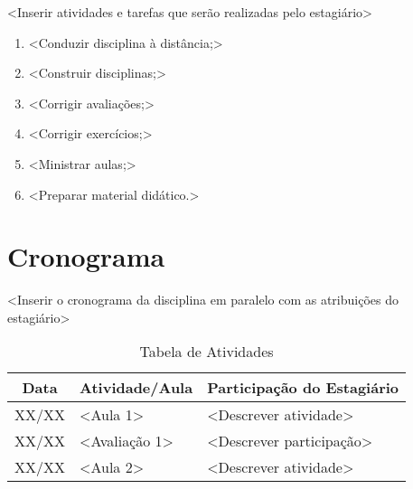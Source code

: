 \documentclass[12pt, a4paper]{article}
\begin{document}

<Inserir atividades e tarefas que serão realizadas pelo estagiário>

\begin{enumerate}
    \item <Conduzir disciplina à distância;>
    \item <Construir disciplinas;>
    \item <Corrigir avaliações;>
    \item <Corrigir exercícios;>
    \item <Ministrar aulas;>
    \item <Preparar material didático.>
\end{enumerate}

\section{Cronograma} \label{sec:cronograma}


<Inserir o cronograma da disciplina em paralelo com as atribuições do estagiário>

\begin{table}[htbp] \centering \caption{Tabela de Atividades} \label{tab:atividades}
    \begin{tabular}{|c|l|l|} \hline
        \textbf{Data} & \textbf{Atividade/Aula} & \textbf{Participação do Estagiário} \\ \hline
        XX/XX & <Aula 1> & <Descrever atividade> \\ \hline
        XX/XX & <Avaliação 1> & <Descrever participação> \\ \hline
        XX/XX & <Aula 2> & <Descrever atividade> \\ \hline
    \end{tabular}
\end{table}
\end{document}
